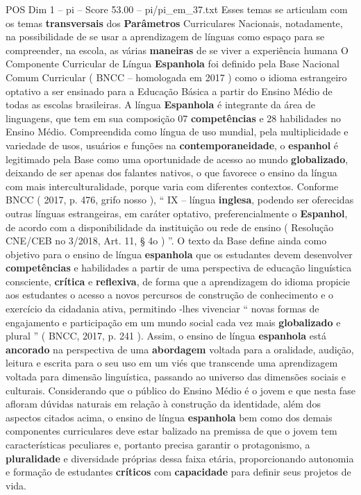 \begin{textsample}{POS Dim 1 – pi – Score 53.00 – pi/pi\_em\_37.txt}
Esses temas se articulam com os temas \textbf{transversais} dos \textbf{Parâmetros} Curriculares Nacionais, notadamente, na possibilidade de se usar a aprendizagem de línguas como espaço para se compreender, na escola, as várias \textbf{maneiras} de se viver a experiência humana O Componente Curricular de Língua \textbf{Espanhola} foi definido pela Base Nacional Comum Curricular ( BNCC – homologada em 2017 ) como o idioma estrangeiro optativo a ser ensinado para a Educação Básica a partir do Ensino Médio de todas as escolas brasileiras.
A língua \textbf{Espanhola} é integrante da área de linguagens, que tem em sua composição 07 \textbf{competências} e 28 habilidades no Ensino Médio.
Compreendida como língua de uso mundial, pela multiplicidade e variedade de usos, usuários e funções na \textbf{contemporaneidade}, o \textbf{espanhol} é legitimado pela Base como uma oportunidade de acesso ao mundo \textbf{globalizado}, deixando de ser apenas dos falantes nativos, o que favorece o ensino da língua com mais interculturalidade, porque varia com diferentes contextos.
Conforme BNCC ( 2017, p. 476, grifo nosso ), “ IX – língua \textbf{inglesa}, podendo ser oferecidas outras línguas estrangeiras, em caráter optativo, preferencialmente o \textbf{Espanhol}, de acordo com a disponibilidade da instituição ou rede de ensino ( Resolução CNE/CEB no 3/2018, Art. 11, § 4o ) ”.
O texto da Base define ainda como objetivo para o ensino de língua \textbf{espanhola} que os estudantes devem desenvolver \textbf{competências} e habilidades a partir de uma perspectiva de educação linguística consciente, \textbf{crítica} e \textbf{reflexiva}, de forma que a aprendizagem do idioma propicie aos estudantes o acesso a novos percursos de construção de conhecimento e o exercício da cidadania ativa, permitindo -lhes vivenciar “ novas formas de engajamento e participação em um mundo social cada vez mais \textbf{globalizado} e plural ” ( BNCC, 2017, p. 241 ).
Assim, o ensino de língua \textbf{espanhola} está \textbf{ancorado} na perspectiva de uma \textbf{abordagem} voltada para a oralidade, audição, leitura e escrita para o seu uso em um viés que transcende uma aprendizagem voltada para dimensão linguística, passando ao universo das dimensões sociais e culturais.
Considerando que o público do Ensino Médio é o jovem e que nesta fase afloram dúvidas naturais em relação à construção da identidade, além dos aspectos citados acima, o ensino de língua \textbf{espanhola} bem como dos demais componentes curriculares deve estar balizado na premissa de que o jovem tem características peculiares e, portanto precisa garantir o protagonismo, a \textbf{pluralidade} e diversidade próprias dessa faixa etária, proporcionando autonomia e formação de estudantes \textbf{críticos} com \textbf{capacidade} para definir seus projetos de vida.

\end{textsample}
